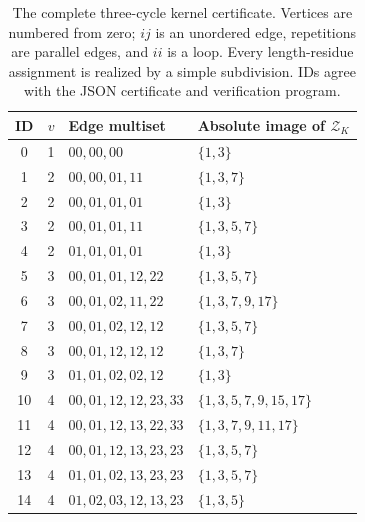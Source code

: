 \documentclass[11pt]{article}
\numberwithin{equation}{section}
\theoremstyle{definition}
\begin{document}
\begin{table}[htbp]
\centering\small
\begin{tabular}{crll}
\toprule
ID & $v$ & Edge multiset & Absolute image of $\mathcal Z_K$\\
\midrule
0 & 1 & $00,00,00$ & $\{1,3\}$\\
1 & 2 & $00,00,01,11$ & $\{1,3,7\}$\\
2 & 2 & $00,01,01,01$ & $\{1,3\}$\\
3 & 2 & $00,01,01,11$ & $\{1,3,5,7\}$\\
4 & 2 & $01,01,01,01$ & $\{1,3\}$\\
5 & 3 & $00,01,01,12,22$ & $\{1,3,5,7\}$\\
6 & 3 & $00,01,02,11,22$ & $\{1,3,7,9,17\}$\\
7 & 3 & $00,01,02,12,12$ & $\{1,3,5,7\}$\\
8 & 3 & $00,01,12,12,12$ & $\{1,3,7\}$\\
9 & 3 & $01,01,02,02,12$ & $\{1,3\}$\\
10 & 4 & $00,01,12,12,23,33$ & $\{1,3,5,7,9,15,17\}$\\
11 & 4 & $00,01,12,13,22,33$ & $\{1,3,7,9,11,17\}$\\
12 & 4 & $00,01,12,13,23,23$ & $\{1,3,5,7\}$\\
13 & 4 & $01,01,02,13,23,23$ & $\{1,3,5,7\}$\\
14 & 4 & $01,02,03,12,13,23$ & $\{1,3,5\}$\\
\bottomrule
\end{tabular}
\caption{The complete three-cycle kernel certificate. Vertices are numbered
from zero; $ij$ is an unordered edge, repetitions are parallel edges, and
$ii$ is a loop. Every length-residue assignment is realized by a simple
subdivision. IDs agree with the JSON certificate and verification program.}
\label{cb:tab:kernels}
\end{table}
\end{document}
